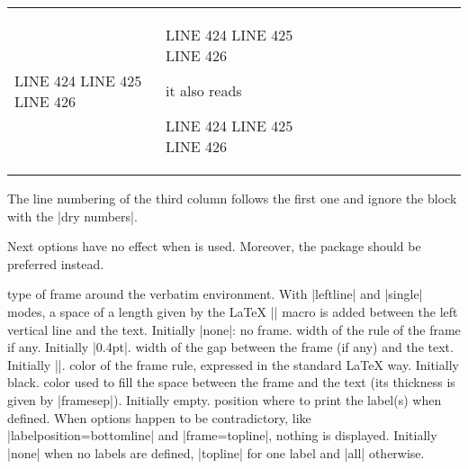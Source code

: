 \documentclass{article}
\def\CDRCheckRed {}
\begin{document}
\begin{description}
\begin{center}
\begin{tabular}{p{0.333\linewidth}p{0.333\linewidth}p{0.333\linewidth}}
\begin{CDRBlock}[
  numbers=left,
  firstnumber=last,
  dry numbers,
]
LINE 424
LINE 425
LINE 426
\end{CDRBlock}
&
\begin{CDRBlock}[tags=src,no top space]
\begin{⟨CDRBlock⟩}[
  firstnumber=last,
  
]
LINE 424
LINE 425
LINE 426
\end{⟨CDRBlock⟩}
\end{CDRBlock}
it also reads
\begin{CDRBlock}[
  numbers=left,
  firstnumber=last,
  dry numbers,
]
LINE 424
LINE 425
LINE 426
\end{CDRBlock}
\end{tabular}
\end{center}
The line numbering of the third column follows the first one and ignore the block with the \CDRCode[tags=options]|dry numbers|.
\end{description}
Next options have no effect when  is used.
Moreover, the  package should be preferred instead.
\begin{description}
\itemtt[\CDRCheckRed frame=none|leftline|topline|bottomline|lines|single]
type of frame around the verbatim environment.
With \CDRCode|leftline| and \CDRCode|single| modes, a space of a length given
by the \LaTeX{} \CDRCode|\fboxsep| macro is added between the left vertical line
and the text. Initially \CDRCode|none|: no frame.
\itemtt[\CDRCheckRed framerule=\CDRMeta{dimension}]
width of the rule of the frame if any.
Initially \CDRCode|0.4pt|.
\itemtt[\CDRCheckRed framesep=\CDRMeta{dimension}]
width of the gap between the frame (if any) and the text.
Initially \CDRCode|\fboxsep|.
\itemtt[\CDRCheckRed rulecolor=\CDRMeta{color command}]
color of the frame rule, expressed in the standard \LaTeX{} way.
Initially black.
\itemtt[\CDRCheckRed rulecolor=\CDRMeta{color command}]
color used to fill the space between the frame and the text
(its thickness is given by \CDRCode|framesep|).
Initially empty.
\itemtt[\CDRCheckRed labelposition=none|topline|bottomline|all]
position where to print the label(s) when defined.
When options happen to be contradictory,
like \CDRCode[mbox=false]|labelposition=bottomline|
and \CDRCode|frame=topline|,
nothing is displayed.
Initially \CDRCode|none| when no labels are defined,
\CDRCode|topline| for one label and \CDRCode|all| otherwise.

\end{description}
\end{document}
